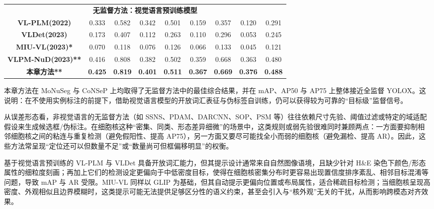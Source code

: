 \begin{table}[t]
\begin{center}
{\begin{tabular}{ccccccccc}
\multicolumn{9}{c}{\textbf{无监督方法：视觉语言预训练模型}} \\
\textbf{VL-PLM(2022)\cite{zhao2022exploiting}} & 0.333 & 0.582 & 0.342 & 0.501 & 0.159 & 0.357 & 0.120 & 0.291 \\
\textbf{VLDet(2023)\cite{lin2022learning}} & 0.173 & 0.407 & 0.112 & 0.263 & 0.110 & 0.296 & 0.053 & 0.245 \\
\textbf{MIU-VL(2023)*\cite{qin2022medical}} & 0.070 & 0.118 & 0.076 & 0.126 & 0.066 & 0.133 & 0.045 & 0.121 \\
\textbf{VLPM-NuD(2023)**\cite{wu2023zeroshot}} & 0.416 & 0.808 & 0.382 & 0.502 & 0.359 & 0.668 & 0.363 & 0.480 \\
\textbf{本章方法**} & \textbf{0.425} & \textbf{0.819} & \textbf{0.401} & \textbf{0.511} & \textbf{0.367} & \textbf{0.669} & \textbf{0.376} & \textbf{0.488} \\ \bottomrule[1.5pt]
\end{tabular}
}
\end{center}
\end{table}


本章方法在 MoNuSeg 与 CoNSeP 上均取得了无监督方法中的最佳综合结果，并在 mAP、AP50 与 AP75 上整体接近全监督 YOLOX。这说明：在不使用实例标注的前提下，借助视觉语言模型的开放词汇表征与伪标签自训练，仍可以获得较为可靠的“目标级”监督信号。

从误差形态看，非视觉语言的无监督方法（如 SSNS、PDAM、DARCNN、SOP、PSM 等）往往依赖尺寸先验、阈值过滤或特定的域适配假设来生成候选框/伪标注。在细胞核这种“密集、同类、形态差异细微”的场景中，这类规则或弱先验很难同时兼顾两点：一方面要抑制相邻细胞核之间的粘连与重复检测（避免假阳性、提高 AP75），另一方面又要尽可能找全小而弱的细胞核（避免漏检、提高 AR）。因此，这些方法常呈现“定位还可以但数量不足”或“数量尚可但框偏移明显”的权衡。

基于视觉语言预训练的 VL-PLM 与 VLDet 具备开放词汇能力，但其提示设计通常来自自然图像语境，且缺少针对 H\&E 染色下颜色/形态属性的细粒度刻画；再加上它们的检测设定更偏向于中低密度目标，使得在细胞核密集分布时更容易出现置信度排序紊乱、相邻目标混淆等问题，导致 mAP 与 AR 受限。MIU-VL 同样以 GLIP 为基础，但其自动提示更偏向位置或布局属性，适合稀疏目标检测；当细胞核呈现高密度、外观相似且边界模糊时，这类提示可能无法提供足够区分性的语义约束，甚至会引入与“核外观”无关的干扰，从而影响跨模态对齐效果。

